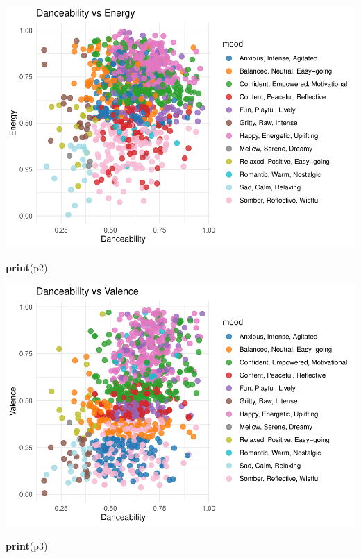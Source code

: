 \documentclass[
]{article}
\newenvironment{Shaded}{\begin{snugshade}}{\end{snugshade}}
\newcommand{\FunctionTok}[1]{\textcolor[rgb]{0.13,0.29,0.53}{\textbf{#1}}}
\newcommand{\NormalTok}[1]{#1}
\begin{document}
\includegraphics{SpotifyProjectPDF_files/figure-latex/unnamed-chunk-14-1.pdf}

\begin{Shaded}
\begin{Highlighting}[]
\FunctionTok{print}\NormalTok{(p2)}
\end{Highlighting}
\end{Shaded}

\includegraphics{SpotifyProjectPDF_files/figure-latex/unnamed-chunk-14-2.pdf}

\begin{Shaded}
\begin{Highlighting}[]
\FunctionTok{print}\NormalTok{(p3)}
\end{Highlighting}
\end{Shaded}
\end{document}
